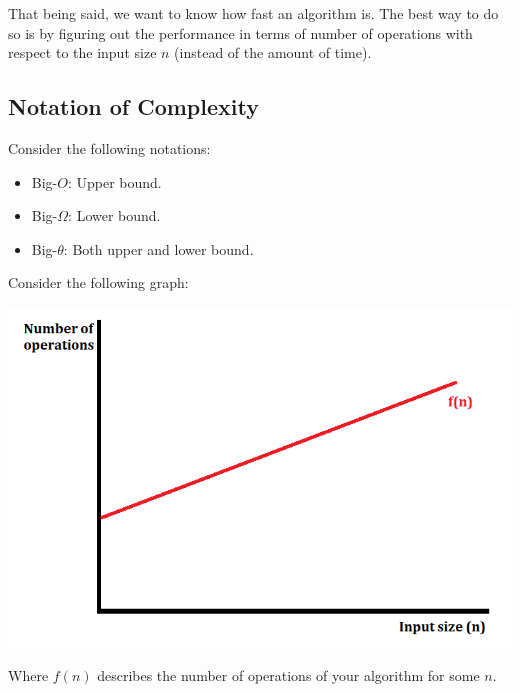 \documentclass[letterpaper]{article}
\begin{document}
\bigskip 

That being said, we want to know how fast an algorithm is. The best way to do so is by figuring out the performance in terms of number of operations with respect to the input size $n$ (instead of the amount of time). 

\subsection{Notation of Complexity}
Consider the following notations: 
\begin{itemize}
    \item Big-$O$: Upper bound. 
    \item Big-$\Omega$: Lower bound. 
    \item Big-$\theta$: Both upper and lower bound. 
\end{itemize}
Consider the following graph: 
\begin{center}
    \includegraphics[scale=0.5]{img/graph1.PNG}
\end{center}
Where $f(n)$ describes the number of operations of your algorithm for some $n$. 
\end{document}
